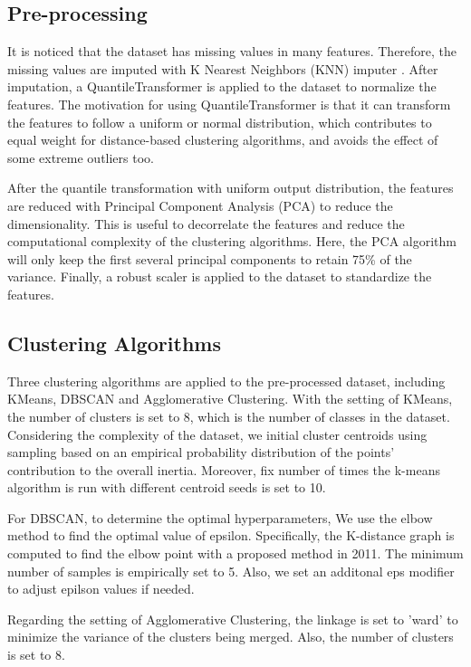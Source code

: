 \documentclass[12pt,a4paper]{article}
\begin{document}
\subsection{Pre-processing}\label{subsec:preprocessing}
It is noticed that the dataset has missing values in many features. Therefore, the missing values are imputed with K Nearest Neighbors (KNN) imputer \cite{scikit-learn_KNNImputer}. 
After imputation, a QuantileTransformer \cite{scikit-learn_QuantileTransformer} is applied to the dataset to normalize the features. 
The motivation for using QuantileTransformer is that it can transform the features to follow a uniform or normal distribution, 
which contributes to equal weight for distance-based clustering algorithms, and avoids the effect of some extreme outliers too.

After the quantile transformation with uniform output distribution, the features are reduced with Principal Component Analysis (PCA) \cite{MACKIEWICZ1993303} to reduce the dimensionality. 
This is useful to decorrelate the features and reduce the computational complexity of the clustering algorithms. Here, the PCA algorithm will only keep the first several principal components to retain 75\% of the variance. 
Finally, a robust scaler \cite{scikit-learn_RobustScaler} is applied to the dataset to standardize the features.

\subsection{Clustering Algorithms}\label{subsec:clustering}
Three clustering algorithms are applied to the pre-processed dataset, including KMeans, DBSCAN and Agglomerative Clustering. 
With the setting of KMeans, the number of clusters is set to 8, which is the number  of classes in the dataset. Considering the complexity of the dataset, we initial cluster centroids using sampling based on an empirical probability distribution of the points' contribution to the overall inertia. 
Moreover, fix number of times the k-means algorithm is run with different centroid seeds is set to 10.

For DBSCAN, to determine the optimal hyperparameters, We use the elbow method to find the optimal value of epsilon. Specifically, the K-distance graph is computed to find the elbow point with a proposed method \cite{kneedle_python} in 2011. 
The minimum number of samples is empirically set to 5. Also, we set an additonal eps modifier to adjust epilson values if needed.

Regarding the setting of Agglomerative Clustering, the linkage is set to 'ward' to minimize the variance of the clusters being merged. Also, the number of clusters is set to 8.
\end{document}
